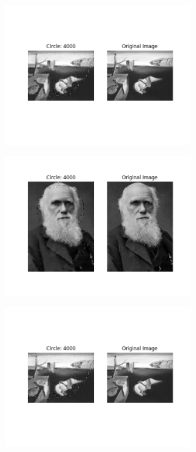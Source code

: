 \documentclass[12pt]{article}
\begin{document}
\begin{figure}[H]
\centering
\noindent\includegraphics[width=0.75\textwidth]{../results/dali/dali_4000}
\end{figure}
\begin{figure}[H]
\centering
\noindent\includegraphics[width=0.75\textwidth]{../results/darwin/darwin_4000}
\end{figure}
\begin{figure}[H]
\centering
\noindent\includegraphics[width=0.75\textwidth]{../results/dali/dali_4000}
\end{figure}
\end{document}
